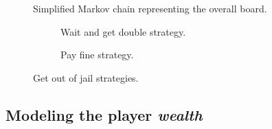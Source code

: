 \newpage
\begin{figure}[H]
  \begin{center}
    
  \end{center}
  \caption{Simplified Markov chain representing the overall board.}
  \label{fig:markov_monop}
\end{figure}

\begin{figure}[H] %
    \begin{subfigure}[b]{0.5\textwidth}
      
      \caption{Wait and get double strategy.}
      \label{fig:jail_double}
    \end{subfigure}
    \hspace{3cm}
    \begin{subfigure}[b]{0.24\textwidth}
      
      \caption{Pay fine strategy.}
      \label{fig:jail_pay}
    \end{subfigure}
  \caption{Get out of jail strategies.}
\end{figure}

\newpage


\subsection{Modeling the player \emph{wealth}} %
\label{sub:modeling_the_player_emph_wealth}



